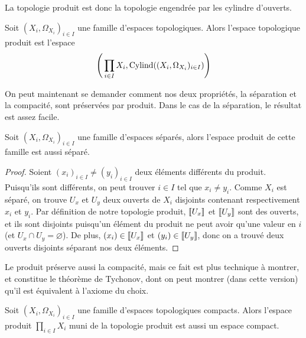La topologie produit est donc la topologie engendrée par les cylindre d'ouverts.

\begin{definition}
  Soit $(X_i,\Omega_{X_i})_{i\in I}$ une famille d'espaces topologiques. Alors
  l'espace topologique produit est l'espace
  \[\Bigg(\prod_{i\in I} X_i, \operatorname{Cylind}((X_i,\Omega_{X_i})_{i\in I})\Bigg)\]
\end{definition}

On peut maintenant se demander comment nos deux propriétés, la séparation et la
compacité, sont préservées par produit. Dans le cas de la séparation, le
résultat est assez facile.

\begin{proposition}
  Soit $(X_i,\Omega_{X_i})_{i\in I}$ une famille d'espaces séparés, alors l'espace
  produit de cette famille est aussi séparé.
\end{proposition}

\begin{proof}
  Soient $(x_i)_{i\in I}\neq (y_i)_{i\in I}$ deux éléments différents du produit.
  Puisqu'ils sont différents, on peut trouver $i\in I$ tel que $x_i \neq y_i$.
  Comme $X_i$ est séparé, on trouve $U_x$ et $U_y$ deux ouverts de $X_i$
  disjoints contenant respectivement $x_i$ et $y_i$. Par définition de notre
  topologie produit, $\llbracket U_x\rrbracket$ et $\llbracket U_y\rrbracket$ sont des ouverts, et ils
  sont disjoints puisqu'un élément du produit ne peut avoir qu'une valeur en $i$
  (et $U_x\cap U_y = \varnothing$). De plus, $(x_i)\in \llbracket U_x\rrbracket$ et
  $(y_i)\in\llbracket U_y\rrbracket$, donc on a trouvé deux ouverts disjoints séparant nos
  deux éléments.
\end{proof}

Le produit préserve aussi la compacité, mais ce fait est plus technique à
montrer, et constitue le théorème de Tychonov, dont on peut montrer (dans cette
version) qu'il est équivalent à l'axiome du choix.

\begin{theorem}
  Soit $(X_i,\Omega_{X_i})_{i\in I}$ une famille d'espaces topologiques compacts.
  Alors l'espace produit $\displaystyle\prod_{i\in I} X_i$ muni de la topologie
  produit est aussi un espace compact.
\end{theorem}

